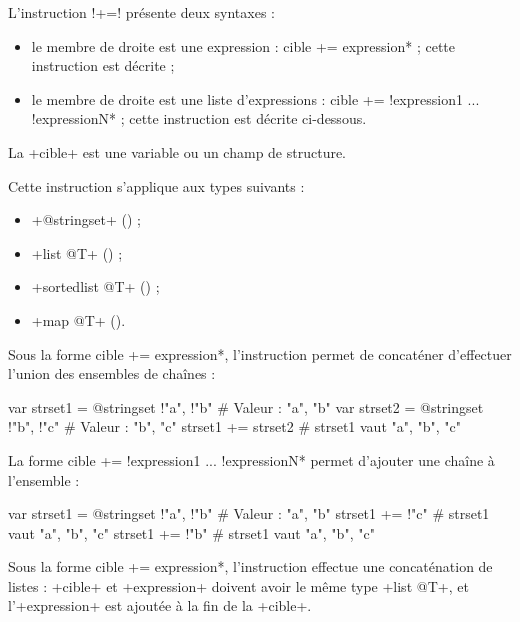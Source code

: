 L'instruction \ggs!+=! présente deux syntaxes :
\begin{itemize}
  \item le membre de droite est une expression : \ggs*cible += expression* ; cette instruction est décrite  ;
  \item le membre de droite est une liste d'expressions : \ggs*cible += !expression1 ... !expressionN* ; cette instruction est décrite ci-dessous.
\end{itemize}

La \ggs+cible+ est une variable ou un champ de structure.

Cette instruction s'applique aux types suivants :
\begin{itemize}
  \item \ggs+@stringset+ () ;
  \item \ggs+list @T+ () ;
  \item \ggs+sortedlist @T+ () ;
  \item \ggs+map @T+ ().
\end{itemize}



Sous la forme \ggs*cible += expression*, l'instruction permet de concaténer d'effectuer l'union des ensembles de chaînes :
\begin{galgas}
var strset1 = @stringset {!"a", !"b"} # Valeur : "a", "b"
var strset2 = @stringset {!"b", !"c"} # Valeur : "b", "c"
strset1 += strset2 # strset1 vaut "a", "b", "c"
\end{galgas}

La forme \ggs*cible += !expression1 ... !expressionN* permet d'ajouter une chaîne à l'ensemble :
\begin{galgas}
var strset1 = @stringset {!"a", !"b"} # Valeur : "a", "b"
strset1 += !"c" # strset1 vaut "a", "b", "c"
strset1 += !"b" # strset1 vaut "a", "b", "c"
\end{galgas}




Sous la forme \ggs*cible += expression*, l'instruction effectue une concaténation de listes : \ggs+cible+ et \ggs+expression+ doivent avoir le même type \ggs+list @T+, et l'\ggs+expression+ est ajoutée à la fin de la \ggs+cible+.

